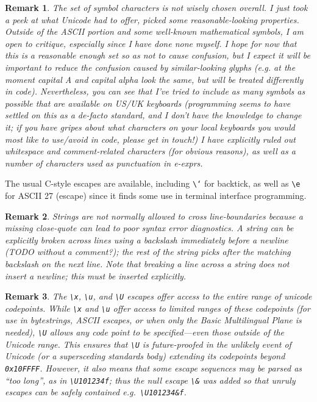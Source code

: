 \documentclass[11pt]{article} %
\newtheorem*{remark}{Remark}
\begin{document}
\begin{remark}
The set of symbol characters is \emph{not} wisely chosen overall.
I just took a peek at what Unicode had to offer, picked some reasonable-looking properties.
Outside of the ASCII portion and some well-known mathematical symbols, I am open to critique, especially since I have done none myself.
I hope for now that this is a reasonable enough set so as not to cause confusion, but I expect it will be important to reduce the confusion caused by similar-looking glyphs (e.g. at the moment capital A and capital alpha look the same, but will be treated differently in code).
Nevertheless, you can see that I've tried to include as many symbols as possible that are available on US/UK keyboards (programming seems to have settled on this as a de-facto standard, and I don't have the knowledge to change it; if you have gripes about what characters on your local keyboards you would most like to use/avoid in code, please get in touch!)
I have explicitly ruled out whitespace and comment-related characters (for obvious reasons), as well as a number of characters used as punctuation in e-exprs.
\end{remark}

The usual C-style escapes are available, including \texttt{\textbackslash`} for backtick, as well as \texttt{\textbackslash e} for ASCII 27 (escape) since it finds some use in terminal interface programming.

\begin{remark}
Strings are not normally allowed to cross line-boundaries because a missing close-quote can lead to poor syntax error diagnostics.
A string can be explicitly broken across lines using a backslash immediately before a newline (TODO without a comment?);
  the rest of the string picks after the matching backslash on the next line.
Note that breaking a line across a string does not insert a newline; this must be inserted explicitly.
\end{remark}

\begin{remark}
The \texttt{\textbackslash x}, \texttt{\textbackslash u}, and \texttt{\textbackslash U} escapes offer access to the entire range of unicode codepoints.
While \texttt{\textbackslash x} and \texttt{\textbackslash u} offer access to limited ranges of these codepoints (for use in bytestrings, ASCII escapes, or when only the Basic Multilingual Plane is needed), \texttt{\textbackslash U} allows any code point to be specified---even those outside of the Unicode range.
This ensures that \texttt{\textbackslash U} is future-proofed in the unlikely event of Unicode (or a supersceding standards body) extending its codepoints beyond \texttt{0x10FFFF}.
However, it also means that some escape sequences may be parsed as ``too long'', as in \texttt{\textbackslash U101234f}; thus the null escape \texttt{\textbackslash\&} was added so that unruly escapes can be safely contained e.g.\ \texttt{\textbackslash U101234\&f}.
\end{remark}
\end{document}

